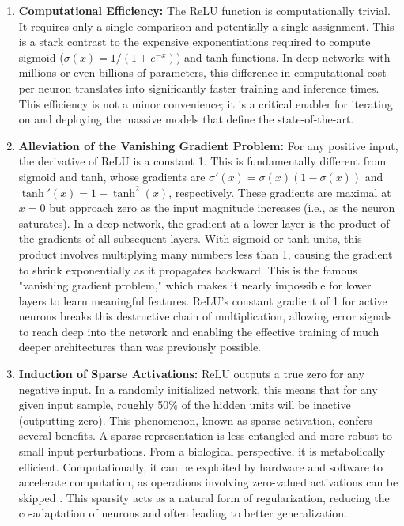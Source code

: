\begin{enumerate}
    \item \textbf{Computational Efficiency:} The ReLU function is computationally trivial. It requires only a single comparison and potentially a single assignment. This is a stark contrast to the expensive exponentiations required to compute sigmoid ($\sigma(x) = 1 / (1+e^{-x})$) and tanh functions. In deep networks with millions or even billions of parameters, this difference in computational cost per neuron translates into significantly faster training and inference times. This efficiency is not a minor convenience; it is a critical enabler for iterating on and deploying the massive models that define the state-of-the-art.

    \item \textbf{Alleviation of the Vanishing Gradient Problem:} For any positive input, the derivative of ReLU is a constant 1. This is fundamentally different from sigmoid and tanh, whose gradients are $\sigma'(x) = \sigma(x)(1-\sigma(x))$ and $\tanh'(x) = 1 - \tanh^2(x)$, respectively. These gradients are maximal at $x=0$ but approach zero as the input magnitude increases (i.e., as the neuron saturates). In a deep network, the gradient at a lower layer is the product of the gradients of all subsequent layers. With sigmoid or tanh units, this product involves multiplying many numbers less than 1, causing the gradient to shrink exponentially as it propagates backward. This is the famous "vanishing gradient problem," which makes it nearly impossible for lower layers to learn meaningful features. ReLU's constant gradient of 1 for active neurons breaks this destructive chain of multiplication, allowing error signals to reach deep into the network and enabling the effective training of much deeper architectures than was previously possible.

    \item \textbf{Induction of Sparse Activations:} ReLU outputs a true zero for any negative input. In a randomly initialized network, this means that for any given input sample, roughly 50\% of the hidden units will be inactive (outputting zero). This phenomenon, known as sparse activation, confers several benefits. A sparse representation is less entangled and more robust to small input perturbations. From a biological perspective, it is metabolically efficient. Computationally, it can be exploited by hardware and software to accelerate computation, as operations involving zero-valued activations can be skipped \cite{GlorotBordesBengio2011DeepSparse}. This sparsity acts as a natural form of regularization, reducing the co-adaptation of neurons and often leading to better generalization.
\end{enumerate}


